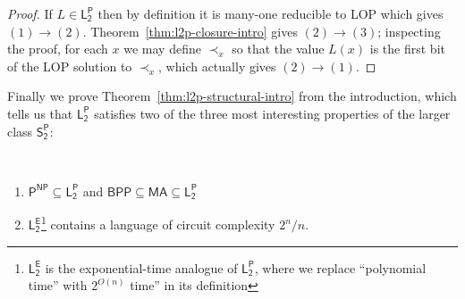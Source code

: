 \begin{proof}
If $L \in \mathsf{L_2^P}$ then by definition it is many-one reducible to {\sc LOP} which gives $(1)\rightarrow(2)$. Theorem~\ref{thm:l2p-closure-intro} gives $(2)\rightarrow(3)$; inspecting the proof, for each $x$ we may define $\prec_x$ so that the value $L(x)$ is the first bit of the {\sc LOP} solution to $\prec_x$, which actually gives $(2)\rightarrow(1)$.
\end{proof}

Finally we prove Theorem~\ref{thm:l2p-structural-intro} from the introduction, which tells us that $\mathsf{L_2^P}$ satisfies two of the three most interesting properties of the larger class $\mathsf{S_2^P}$:


\medskip

{\it \phantom\\
\begin{enumerate}
    \item $\mathsf{P^{NP}} \subseteq \mathsf{L_2^P}$ and $\mathsf{BPP} \subseteq \mathsf{MA} \subseteq \mathsf{L_2^P}$
    \item $\mathsf{L_2^E}$\footnote{$\mathsf{L_2^E}$ is the exponential-time analogue of $\mathsf{L_2^P}$, where we replace ``polynomial time'' with $2^{O(n)}$ time'' in its definition} contains a language of circuit complexity $2^n/n$.
\end{enumerate}
}

